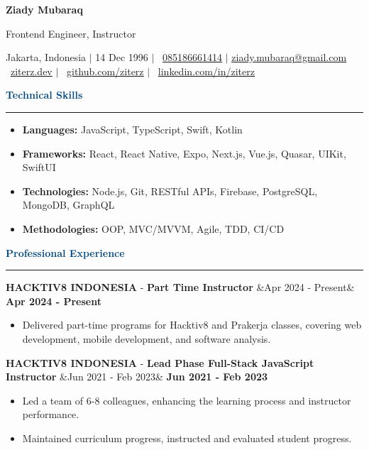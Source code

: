 \documentclass{article}
\newcommand{\header}[1]{
	\vspace{2mm}
	{\large \noindent \textcolor[HTML]{004780}{\textbf{#1}}}
	\vspace{0.5mm}
	\hrule
	\vspace{1.5mm}
}
\newcommand{\skillsheader}[1]{
	\vspace{2mm}
	{\large \noindent \textcolor[HTML]{004780}{\textbf{#1}}}
	\vspace{1.5mm}
	\hrule
	\vspace{1.5mm}
}
\newcommand{\longitem}[4]{
	\begin{adjustwidth}{}{}
		\MakeUppercase{\textbf{#1}} - \textbf{#3} \hfill \ifx&#2& \else \textbf{#2} \fi \\
	\end{adjustwidth}
	\vspace{-1mm}
}
\newcommand{\skills}[1]{%
	\begin{itemize}[leftmargin=*]\leftskip=0.5em
		\setlength\itemsep{-1mm}
		\vspace{-1mm}
		#1
	\end{itemize}%
}
\newcommand{\liststart}{\begin{itemize}[leftmargin=*]\leftskip=0.5em\vspace{-5mm}}
\newcommand{\listend}{\end{itemize}\vspace{0.2mm}}
\begin{document}
	\begin{flushleft}
		{\LARGE \textbf{Ziady Mubaraq}} \\

		\vspace{1mm}

		{\large Frontend Engineer, Instructor}

		\vspace{1mm}
		
		Jakarta, Indonesia  $\mid$ 14 Dec 1996 $\mid$ \faWhatsapp ~\href{https://wa.me/6285186661414}{\underline{085186661414}} $\mid$ \faEnvelope[regular] \href{mailto:ziady.mubaraq@gmail.com}{\underline{ziady.mubaraq@gmail.com}} \\
		\faLink ~\href{https://ziterz.dev}{\underline{ziterz.dev}}  $\mid$ \faGithub ~\href{https://github.com/ziterz}{\underline{github.com/ziterz}} $\mid$ \faLinkedin ~\href{https://linkedin.com/in/ziterz}{\underline{linkedin.com/in/ziterz}}
	\end{flushleft}

	\vspace{-1mm}

	\skillsheader{Technical Skills}
	\skills{
		\item \textbf{Languages:} JavaScript, TypeScript, Swift, Kotlin
		\item \textbf{Frameworks:} React, React Native, Expo, Next.js, Vue.js, Quasar, UIKit, SwiftUI
		\item \textbf{Technologies:} Node.js, Git, RESTful APIs, Firebase, PostgreSQL, MongoDB, GraphQL
		\item \textbf{Methodologies:} OOP, MVC/MVVM, Agile, TDD, CI/CD
	}		

	\header{Professional Experience}
		\longitem{Hacktiv8 Indonesia}{Apr 2024 - Present}{Part Time Instructor}{}
		\liststart
			\item Delivered part-time programs for Hacktiv8 and Prakerja classes, covering web development, mobile development, and software analysis.
		\listend

		\longitem{Hacktiv8 Indonesia}{Jun 2021 - Feb 2023}{Lead Phase Full-Stack JavaScript Instructor}{}
		\liststart
			\item Led a team of 6-8 colleagues, enhancing the learning process and instructor performance. \vspace{-1mm}
			\item Maintained curriculum progress, instructed and evaluated student progress.
		\listend
\end{document}
